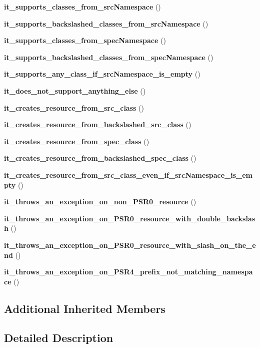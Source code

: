\begin{DoxyCompactItemize}
\item 
{\bf it\+\_\+supports\+\_\+classes\+\_\+from\+\_\+src\+Namespace} ()
\item 
{\bf it\+\_\+supports\+\_\+backslashed\+\_\+classes\+\_\+from\+\_\+src\+Namespace} ()
\item 
{\bf it\+\_\+supports\+\_\+classes\+\_\+from\+\_\+spec\+Namespace} ()
\item 
{\bf it\+\_\+supports\+\_\+backslashed\+\_\+classes\+\_\+from\+\_\+spec\+Namespace} ()
\item 
{\bf it\+\_\+supports\+\_\+any\+\_\+class\+\_\+if\+\_\+src\+Namespace\+\_\+is\+\_\+empty} ()
\item 
{\bf it\+\_\+does\+\_\+not\+\_\+support\+\_\+anything\+\_\+else} ()
\item 
{\bf it\+\_\+creates\+\_\+resource\+\_\+from\+\_\+src\+\_\+class} ()
\item 
{\bf it\+\_\+creates\+\_\+resource\+\_\+from\+\_\+backslashed\+\_\+src\+\_\+class} ()
\item 
{\bf it\+\_\+creates\+\_\+resource\+\_\+from\+\_\+spec\+\_\+class} ()
\item 
{\bf it\+\_\+creates\+\_\+resource\+\_\+from\+\_\+backslashed\+\_\+spec\+\_\+class} ()
\item 
{\bf it\+\_\+creates\+\_\+resource\+\_\+from\+\_\+src\+\_\+class\+\_\+even\+\_\+if\+\_\+src\+Namespace\+\_\+is\+\_\+empty} ()
\item 
{\bf it\+\_\+throws\+\_\+an\+\_\+exception\+\_\+on\+\_\+non\+\_\+\+P\+S\+R0\+\_\+resource} ()
\item 
{\bf it\+\_\+throws\+\_\+an\+\_\+exception\+\_\+on\+\_\+\+P\+S\+R0\+\_\+resource\+\_\+with\+\_\+double\+\_\+backslash} ()
\item 
{\bf it\+\_\+throws\+\_\+an\+\_\+exception\+\_\+on\+\_\+\+P\+S\+R0\+\_\+resource\+\_\+with\+\_\+slash\+\_\+on\+\_\+the\+\_\+end} ()
\item 
{\bf it\+\_\+throws\+\_\+an\+\_\+exception\+\_\+on\+\_\+\+P\+S\+R4\+\_\+prefix\+\_\+not\+\_\+matching\+\_\+namespace} ()
\end{DoxyCompactItemize}
\subsection*{Additional Inherited Members}


\subsection{Detailed Description}


